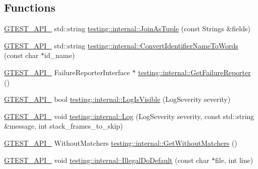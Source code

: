 \subsection*{Functions}
\begin{DoxyCompactItemize}
\item 
\mbox{\hyperlink{_obj__test_2lib_2googletest-release-1_88_81_2googletest_2include_2gtest_2internal_2gtest-port_8h_aa73be6f0ba4a7456180a94904ce17790}{G\+T\+E\+S\+T\+\_\+\+A\+P\+I\+\_\+}} std\+::string \mbox{\hyperlink{namespacetesting_1_1internal_a4ffe5309bf49f08145ed010a6d244e41}{testing\+::internal\+::\+Join\+As\+Tuple}} (const Strings \&fields)
\item 
\mbox{\hyperlink{_obj__test_2lib_2googletest-release-1_88_81_2googletest_2include_2gtest_2internal_2gtest-port_8h_aa73be6f0ba4a7456180a94904ce17790}{G\+T\+E\+S\+T\+\_\+\+A\+P\+I\+\_\+}} std\+::string \mbox{\hyperlink{namespacetesting_1_1internal_a0b375abcf3081393e6c420194a541b29}{testing\+::internal\+::\+Convert\+Identifier\+Name\+To\+Words}} (const char $\ast$id\+\_\+name)
\item 
\mbox{\hyperlink{_obj__test_2lib_2googletest-release-1_88_81_2googletest_2include_2gtest_2internal_2gtest-port_8h_aa73be6f0ba4a7456180a94904ce17790}{G\+T\+E\+S\+T\+\_\+\+A\+P\+I\+\_\+}} Failure\+Reporter\+Interface $\ast$ \mbox{\hyperlink{namespacetesting_1_1internal_a93a00bf550dcc6b1de870d24c624869c}{testing\+::internal\+::\+Get\+Failure\+Reporter}} ()
\item 
\mbox{\hyperlink{_obj__test_2lib_2googletest-release-1_88_81_2googletest_2include_2gtest_2internal_2gtest-port_8h_aa73be6f0ba4a7456180a94904ce17790}{G\+T\+E\+S\+T\+\_\+\+A\+P\+I\+\_\+}} bool \mbox{\hyperlink{namespacetesting_1_1internal_a69ffdba5ee36743e88d8f89b79e566ff}{testing\+::internal\+::\+Log\+Is\+Visible}} (Log\+Severity severity)
\item 
\mbox{\hyperlink{_obj__test_2lib_2googletest-release-1_88_81_2googletest_2include_2gtest_2internal_2gtest-port_8h_aa73be6f0ba4a7456180a94904ce17790}{G\+T\+E\+S\+T\+\_\+\+A\+P\+I\+\_\+}} void \mbox{\hyperlink{namespacetesting_1_1internal_a8a57ce0412334a3f487bbaa8321febbe}{testing\+::internal\+::\+Log}} (Log\+Severity severity, const std\+::string \&message, int stack\+\_\+frames\+\_\+to\+\_\+skip)
\item 
\mbox{\hyperlink{_obj__test_2lib_2googletest-release-1_88_81_2googletest_2include_2gtest_2internal_2gtest-port_8h_aa73be6f0ba4a7456180a94904ce17790}{G\+T\+E\+S\+T\+\_\+\+A\+P\+I\+\_\+}} Without\+Matchers \mbox{\hyperlink{namespacetesting_1_1internal_ad4e02ea077a717f95a10a03c10272f1c}{testing\+::internal\+::\+Get\+Without\+Matchers}} ()
\item 
\mbox{\hyperlink{_obj__test_2lib_2googletest-release-1_88_81_2googletest_2include_2gtest_2internal_2gtest-port_8h_aa73be6f0ba4a7456180a94904ce17790}{G\+T\+E\+S\+T\+\_\+\+A\+P\+I\+\_\+}} void \mbox{\hyperlink{namespacetesting_1_1internal_aa67e1e9d28122eedffbb7b6636824f2d}{testing\+::internal\+::\+Illegal\+Do\+Default}} (const char $\ast$file, int line)
\end{DoxyCompactItemize}
